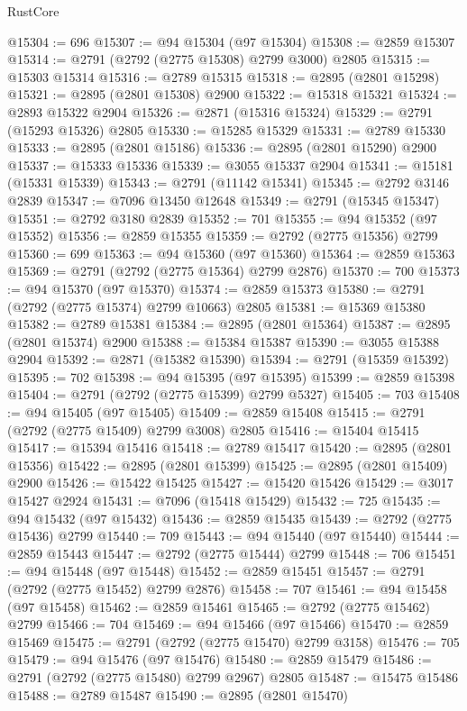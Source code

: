 \begin{lexlean}{RustCore}
\begin{coremodule}
@15304 := 696
@15307 := @94 @15304 (@97 @15304)
@15308 := @2859 @15307
@15314 := @2791 (@2792 (@2775 @15308) @2799 @3000) @2805
@15315 := @15303 @15314
@15316 := @2789 @15315
@15318 := @2895 (@2801 @15298)
@15321 := @2895 (@2801 @15308) @2900
@15322 := @15318 @15321
@15324 := @2893 @15322 @2904
@15326 := @2871 (@15316 @15324)
@15329 := @2791 (@15293 @15326) @2805
@15330 := @15285 @15329
@15331 := @2789 @15330
@15333 := @2895 (@2801 @15186)
@15336 := @2895 (@2801 @15290) @2900
@15337 := @15333 @15336
@15339 := @3055 @15337 @2904
@15341 := @15181 (@15331 @15339)
@15343 := @2791 (@11142 @15341)
@15345 := @2792 @3146 @2839
@15347 := @7096 @13450 @12648
@15349 := @2791 (@15345 @15347)
@15351 := @2792 @3180 @2839
@15352 := 701
@15355 := @94 @15352 (@97 @15352)
@15356 := @2859 @15355
@15359 := @2792 (@2775 @15356) @2799
@15360 := 699
@15363 := @94 @15360 (@97 @15360)
@15364 := @2859 @15363
@15369 := @2791 (@2792 (@2775 @15364) @2799 @2876)
@15370 := 700
@15373 := @94 @15370 (@97 @15370)
@15374 := @2859 @15373
@15380 := @2791 (@2792 (@2775 @15374) @2799 @10663) @2805
@15381 := @15369 @15380
@15382 := @2789 @15381
@15384 := @2895 (@2801 @15364)
@15387 := @2895 (@2801 @15374) @2900
@15388 := @15384 @15387
@15390 := @3055 @15388 @2904
@15392 := @2871 (@15382 @15390)
@15394 := @2791 (@15359 @15392)
@15395 := 702
@15398 := @94 @15395 (@97 @15395)
@15399 := @2859 @15398
@15404 := @2791 (@2792 (@2775 @15399) @2799 @5327)
@15405 := 703
@15408 := @94 @15405 (@97 @15405)
@15409 := @2859 @15408
@15415 := @2791 (@2792 (@2775 @15409) @2799 @3008) @2805
@15416 := @15404 @15415
@15417 := @15394 @15416
@15418 := @2789 @15417
@15420 := @2895 (@2801 @15356)
@15422 := @2895 (@2801 @15399)
@15425 := @2895 (@2801 @15409) @2900
@15426 := @15422 @15425
@15427 := @15420 @15426
@15429 := @3017 @15427 @2924
@15431 := @7096 (@15418 @15429)
@15432 := 725
@15435 := @94 @15432 (@97 @15432)
@15436 := @2859 @15435
@15439 := @2792 (@2775 @15436) @2799
@15440 := 709
@15443 := @94 @15440 (@97 @15440)
@15444 := @2859 @15443
@15447 := @2792 (@2775 @15444) @2799
@15448 := 706
@15451 := @94 @15448 (@97 @15448)
@15452 := @2859 @15451
@15457 := @2791 (@2792 (@2775 @15452) @2799 @2876)
@15458 := 707
@15461 := @94 @15458 (@97 @15458)
@15462 := @2859 @15461
@15465 := @2792 (@2775 @15462) @2799
@15466 := 704
@15469 := @94 @15466 (@97 @15466)
@15470 := @2859 @15469
@15475 := @2791 (@2792 (@2775 @15470) @2799 @3158)
@15476 := 705
@15479 := @94 @15476 (@97 @15476)
@15480 := @2859 @15479
@15486 := @2791 (@2792 (@2775 @15480) @2799 @2967) @2805
@15487 := @15475 @15486
@15488 := @2789 @15487
@15490 := @2895 (@2801 @15470)

\end{coremodule}
\end{lexlean}
